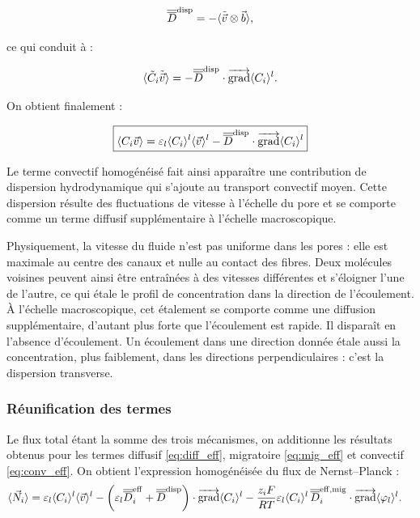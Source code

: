 \begin{equation}
\overline{\overline{D}}^{\mathrm{disp}}
=
-\langle \tilde{\vec{v}} \otimes \vec{b} \rangle,
\end{equation}

ce qui conduit à :

\begin{equation}
\langle \tilde{C}_i \tilde{\vec{v}} \rangle
=
-
\overline{\overline{D}}^{\mathrm{disp}}
\cdot\mathop{\overrightarrow{\operatorname{grad}}}\nolimits \langle C_i \rangle^l.
\end{equation}

On obtient finalement :

\begin{equation}
\boxed{
\langle C_i \vec{v} \rangle
=
\varepsilon_l \langle C_i \rangle^l \langle \vec{v} \rangle^l
-
\overline{\overline{D}}^{\mathrm{disp}}
\cdot\mathop{\overrightarrow{\operatorname{grad}}}\nolimits \langle C_i \rangle^l
}
\label{eq:conv_eff}
\end{equation}

Le terme convectif homogénéisé fait ainsi apparaître une contribution
de dispersion hydrodynamique qui s'ajoute au transport convectif moyen.
Cette dispersion résulte des fluctuations de vitesse à l'échelle du pore
et se comporte comme un terme diffusif supplémentaire à l'échelle
macroscopique.

Physiquement, la vitesse du fluide n'est pas uniforme dans les pores : elle
est maximale au centre des canaux et nulle au contact des fibres. Deux
molécules voisines peuvent ainsi être entraînées à des vitesses différentes et
s'éloigner l'une de l'autre, ce qui étale le profil de concentration dans la
direction de l'écoulement. À l'échelle macroscopique, cet étalement se comporte
comme une diffusion supplémentaire, d'autant plus forte que l'écoulement est
rapide. Il disparaît en l'absence d'écoulement. Un écoulement dans une
direction donnée étale aussi la concentration, plus faiblement, dans les
directions perpendiculaires : c'est la dispersion transverse.

\subsubsection*{Réunification des termes}

Le flux total étant la somme des trois mécanismes, on additionne les
résultats obtenus pour les termes diffusif \eqref{eq:diff_eff}, migratoire
\eqref{eq:mig_eff} et convectif \eqref{eq:conv_eff}. On obtient l'expression
homogénéisée du flux de Nernst--Planck :
\begin{align}
\langle \vec{N}_i \rangle
&=
\varepsilon_l \langle C_i \rangle^l \langle \vec{v} \rangle^l
-
\left(
\varepsilon_l \overline{\overline{D}}_i^{\mathrm{eff}}
+
\overline{\overline{D}}^{\mathrm{disp}}
\right)
\cdot\mathop{\overrightarrow{\operatorname{grad}}}\nolimits\langle C_i \rangle^l
-
\frac{z_iF}{RT}
\varepsilon_l
\langle C_i \rangle^l\,
\overline{\overline{D}}_i^{\mathrm{eff,mig}}
\cdot\mathop{\overrightarrow{\operatorname{grad}}}\nolimits\langle \varphi_l \rangle^l .
\label{eq:Ni_homo}
\end{align}

